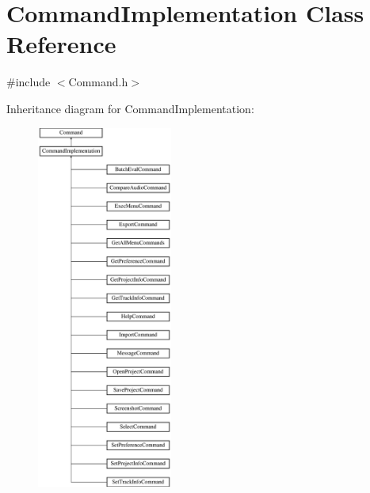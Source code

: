 \hypertarget{class_command_implementation}{}\section{Command\+Implementation Class Reference}
\label{class_command_implementation}


{\ttfamily \#include $<$Command.\+h$>$}

Inheritance diagram for Command\+Implementation\+:\begin{figure}[H]
\begin{center}
\leavevmode
\includegraphics[height=12.000000cm]{class_command_implementation}
\end{center}
\end{figure}
